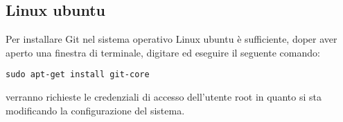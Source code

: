 \subsection{Linux ubuntu}
Per installare Git nel sistema operativo Linux ubuntu è sufficiente, doper aver aperto una finestra di terminale, digitare ed eseguire il seguente comando:

\begin{center}
\texttt{sudo apt-get install git-core}
\end{center}

verranno richieste le credenziali di accesso dell'utente root in quanto si sta modificando la configurazione del sistema.